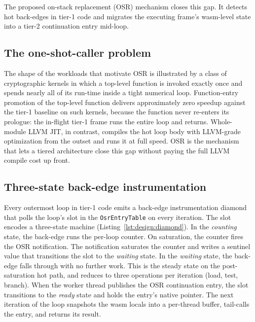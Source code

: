 The proposed on-stack replacement (OSR) mechanism closes this gap. It detects hot back-edges in tier-1 code and migrates the executing frame's wasm-level state into a tier-2 continuation entry mid-loop.

\subsection{The one-shot-caller problem}
\label{sec:design:osr:motivation}

The shape of the workloads that motivate OSR is illustrated by a class of cryptographic kernels in which a top-level function is invoked exactly once and spends nearly all of its run-time inside a tight numerical loop. Function-entry promotion of the top-level function delivers approximately zero speedup against the tier-1 baseline on such kernels, because the function never re-enters its prologue: the in-flight tier-1 frame runs the entire loop and returns. Whole-module LLVM JIT, in contrast, compiles the hot loop body with LLVM-grade optimization from the outset and runs it at full speed. OSR is the mechanism that lets a tiered architecture close this gap without paying the full LLVM compile cost up front.

\subsection{Three-state back-edge instrumentation}
\label{sec:design:osr:diamond}

Every outermost loop in tier-1 code emits a back-edge instrumentation diamond that polls the loop's slot in the \texttt{OsrEntryTable} on every iteration. The slot encodes a three-state machine (Listing~\ref{lst:design:diamond}). In the \emph{counting} state, the back-edge runs the per-loop counter. On saturation, the counter fires the OSR notification. The notification saturates the counter and writes a sentinel value that transitions the slot to the \emph{waiting} state. In the \emph{waiting} state, the back-edge falls through with no further work. This is the steady state on the post-saturation hot path, and reduces to three operations per iteration (load, test, branch). When the worker thread publishes the OSR continuation entry, the slot transitions to the \emph{ready} state and holds the entry's native pointer. The next iteration of the loop snapshots the wasm locals into a per-thread buffer, tail-calls the entry, and returns its result.

